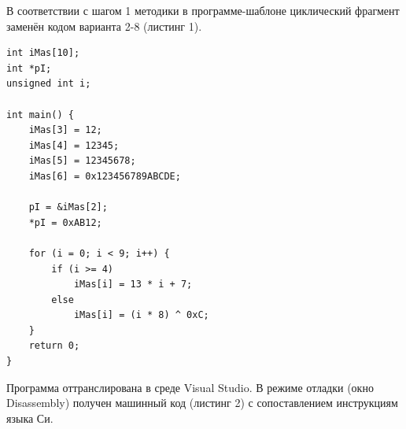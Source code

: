 \documentclass[14pt, a4paper]{extarticle}
\begin{document}
	В соответствии с шагом 1 методики в программе-шаблоне циклический фрагмент заменён кодом варианта 2-8 (листинг 1).
	
	\begin{lstlisting}[caption={Исходная программа (вариант 2-8, глобальные переменные)}]
int iMas[10];
int *pI;
unsigned int i;

int main() {
	iMas[3] = 12;
	iMas[4] = 12345;
	iMas[5] = 12345678;
	iMas[6] = 0x123456789ABCDE;

	pI = &iMas[2];
	*pI = 0xAB12;

	for (i = 0; i < 9; i++) {
		if (i >= 4)
			iMas[i] = 13 * i + 7;
		else
			iMas[i] = (i * 8) ^ 0xC;
	}
	return 0;
}\end{lstlisting}

	Программа оттранслирована в среде Visual Studio. В режиме отладки (окно Disassembly) получен машинный код (листинг 2) с сопоставлением инструкциям языка Си.
\end{document}
